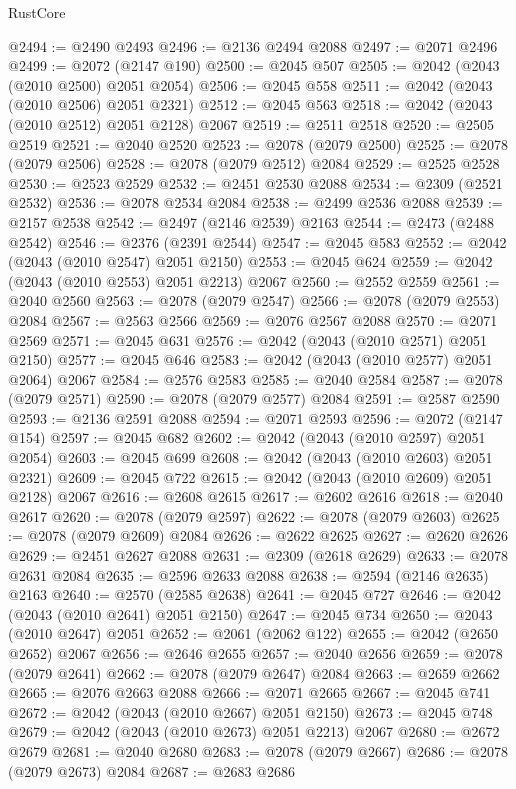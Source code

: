 \begin{lexlean}{RustCore}
\begin{coremodule}
@2494 := @2490 @2493
@2496 := @2136 @2494 @2088
@2497 := @2071 @2496
@2499 := @2072 (@2147 @190)
@2500 := @2045 @507
@2505 := @2042 (@2043 (@2010 @2500) @2051 @2054)
@2506 := @2045 @558
@2511 := @2042 (@2043 (@2010 @2506) @2051 @2321)
@2512 := @2045 @563
@2518 := @2042 (@2043 (@2010 @2512) @2051 @2128) @2067
@2519 := @2511 @2518
@2520 := @2505 @2519
@2521 := @2040 @2520
@2523 := @2078 (@2079 @2500)
@2525 := @2078 (@2079 @2506)
@2528 := @2078 (@2079 @2512) @2084
@2529 := @2525 @2528
@2530 := @2523 @2529
@2532 := @2451 @2530 @2088
@2534 := @2309 (@2521 @2532)
@2536 := @2078 @2534 @2084
@2538 := @2499 @2536 @2088
@2539 := @2157 @2538
@2542 := @2497 (@2146 @2539) @2163
@2544 := @2473 (@2488 @2542)
@2546 := @2376 (@2391 @2544)
@2547 := @2045 @583
@2552 := @2042 (@2043 (@2010 @2547) @2051 @2150)
@2553 := @2045 @624
@2559 := @2042 (@2043 (@2010 @2553) @2051 @2213) @2067
@2560 := @2552 @2559
@2561 := @2040 @2560
@2563 := @2078 (@2079 @2547)
@2566 := @2078 (@2079 @2553) @2084
@2567 := @2563 @2566
@2569 := @2076 @2567 @2088
@2570 := @2071 @2569
@2571 := @2045 @631
@2576 := @2042 (@2043 (@2010 @2571) @2051 @2150)
@2577 := @2045 @646
@2583 := @2042 (@2043 (@2010 @2577) @2051 @2064) @2067
@2584 := @2576 @2583
@2585 := @2040 @2584
@2587 := @2078 (@2079 @2571)
@2590 := @2078 (@2079 @2577) @2084
@2591 := @2587 @2590
@2593 := @2136 @2591 @2088
@2594 := @2071 @2593
@2596 := @2072 (@2147 @154)
@2597 := @2045 @682
@2602 := @2042 (@2043 (@2010 @2597) @2051 @2054)
@2603 := @2045 @699
@2608 := @2042 (@2043 (@2010 @2603) @2051 @2321)
@2609 := @2045 @722
@2615 := @2042 (@2043 (@2010 @2609) @2051 @2128) @2067
@2616 := @2608 @2615
@2617 := @2602 @2616
@2618 := @2040 @2617
@2620 := @2078 (@2079 @2597)
@2622 := @2078 (@2079 @2603)
@2625 := @2078 (@2079 @2609) @2084
@2626 := @2622 @2625
@2627 := @2620 @2626
@2629 := @2451 @2627 @2088
@2631 := @2309 (@2618 @2629)
@2633 := @2078 @2631 @2084
@2635 := @2596 @2633 @2088
@2638 := @2594 (@2146 @2635) @2163
@2640 := @2570 (@2585 @2638)
@2641 := @2045 @727
@2646 := @2042 (@2043 (@2010 @2641) @2051 @2150)
@2647 := @2045 @734
@2650 := @2043 (@2010 @2647) @2051
@2652 := @2061 (@2062 @122)
@2655 := @2042 (@2650 @2652) @2067
@2656 := @2646 @2655
@2657 := @2040 @2656
@2659 := @2078 (@2079 @2641)
@2662 := @2078 (@2079 @2647) @2084
@2663 := @2659 @2662
@2665 := @2076 @2663 @2088
@2666 := @2071 @2665
@2667 := @2045 @741
@2672 := @2042 (@2043 (@2010 @2667) @2051 @2150)
@2673 := @2045 @748
@2679 := @2042 (@2043 (@2010 @2673) @2051 @2213) @2067
@2680 := @2672 @2679
@2681 := @2040 @2680
@2683 := @2078 (@2079 @2667)
@2686 := @2078 (@2079 @2673) @2084
@2687 := @2683 @2686

\end{coremodule}
\end{lexlean}
